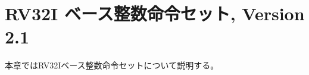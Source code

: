 \begin{comment}
\chapter{RV32I Base Integer Instruction Set, Version 2.1}
\label{rv32}

This chapter describes the RV32I base integer instruction set.
\end{comment}

\chapter{RV32I ベース整数命令セット, Version 2.1}
\label{rv32}

本章ではRV32Iベース整数命令セットについて説明する。

\begin{comment}
\begin{commentary}
RV32I was designed to be sufficient to form a compiler target and to
support modern operating system environments.  The ISA was also
designed to reduce the hardware required in a minimal implementation.
RV32I contains 40 unique instructions, though a simple implementation
might cover the ECALL/EBREAK instructions with a single SYSTEM
hardware instruction that always traps and might be able to implement
the FENCE instruction as a NOP, reducing base instruction count to 38
total.  RV32I can emulate almost any other ISA extension (except the A
extension, which requires additional hardware support for atomicity).

In practice, a hardware implementation including the machine-mode
privileged architecture will also require the 6 CSR instructions.

Subsets of the base integer ISA might be useful for pedagogical
purposes, but the base has been defined such that there should be
little incentive to subset a real hardware implementation beyond
omitting support for misaligned memory accesses and treating all
SYSTEM instructions as a single trap.
\end{commentary}
\end{comment}

